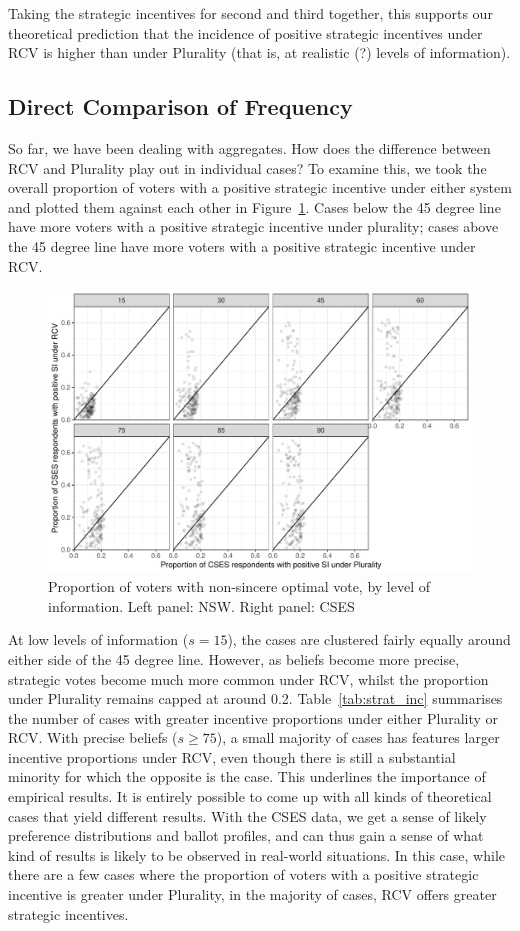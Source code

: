 \documentclass[11pt, letter]{article}
\begin{document}
Taking the strategic incentives for second and third together, this supports our theoretical prediction that the incidence of positive strategic incentives under RCV is higher than under Plurality (that is, at realistic (?) levels of information).

\subsection{Direct Comparison of Frequency}

So far, we have been dealing with aggregates. How does the difference between RCV and Plurality play out in individual cases? To examine this, we took the overall proportion of voters with a positive strategic incentive under either system and plotted them against each other in Figure~\ref{fig:sv_dist}. Cases below the 45 degree line have more voters with a positive strategic incentive under plurality; cases above the 45 degree line have more voters with a positive strategic incentive under RCV.

\begin{figure}[!h]
	\centering
	\includegraphics[width = .8 \textwidth]{"../output/figures/cses_prop"}
	\caption{Proportion of voters with non-sincere optimal vote, by level of information. Left panel: NSW. Right panel: CSES}
	\label{fig:sv_dist}
\end{figure}

At low levels of information ($s = 15$), the cases are clustered fairly equally around either side of the 45 degree line. However, as beliefs become more precise, strategic votes become much more common under RCV, whilst the proportion under Plurality remains capped at around 0.2. Table~\ref{tab:strat_inc} summarises the number  of cases with greater incentive proportions under either Plurality or RCV. With precise beliefs ($s \geq 75$), a small majority of cases has features larger incentive proportions under RCV, even though there is still a substantial minority for which the opposite is the case. This underlines the importance of empirical results. It is entirely possible to come up with all kinds of theoretical cases that yield different results. With the CSES data, we get a sense of likely preference distributions and ballot profiles, and can thus gain a sense of what kind of results is likely to be observed in real-world situations. In this case, while there are a few cases where the proportion of voters with a positive strategic incentive is greater under Plurality, in the majority of cases, RCV offers greater strategic incentives.
\end{document}
